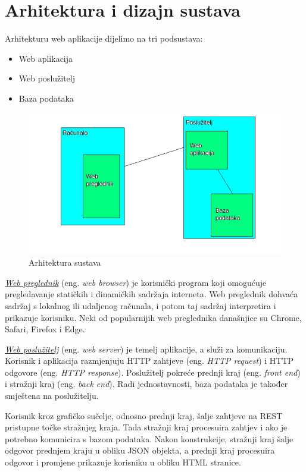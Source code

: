 \chapter{Arhitektura i dizajn sustava}
		

		Arhitekturu web aplikacije dijelimo na tri podsustava:
		\begin{itemize}
			\item Web aplikacija
			\item Web poslužitelj
			\item Baza podataka
		\end{itemize}
	
		\begin{figure}[H]
			\includegraphics[width=\textwidth]{slike/arhitektura.png}
			\centering
			\caption{Arhitektura sustava}
			\label{fig:arhitektura_sustava}
		\end{figure}
	
		\underline{\textit{Web preglednik}} (eng. \textit{web browser}) je korisnički program koji omogućuje pregledavanje statičkih i dinamičkih sadržaja interneta. Web preglednik dohvaća sadržaj s lokalnog ili udaljenog računala, i potom taj sadržaj interpretira i prikazuje korisniku. Neki od popularnijih web preglednika današnjice su Chrome, Safari, Firefox i Edge.
		
		\underline{\textit{Web poslužitelj}} (eng. \textit{web server}) je temelj aplikacije, a služi za komunikaciju. Korisnik i aplikacija razmjenjuju HTTP zahtjeve (eng. \textit{HTTP request}) i HTTP odgovore (eng. \textit{HTTP response}). Poslužitelj pokreće prednji kraj (eng. \textit{front end}) i stražnji kraj (eng. \textit{back end}). Radi jednostavnosti, baza podataka je također smještena na poslužitelju.
		
		Korisnik kroz grafičko sučelje, odnosno prednji kraj, šalje zahtjeve na REST pristupne točke stražnjeg kraja. Tada stražnji kraj procesuira zahtjev i ako je potrebno komunicira s bazom podataka. Nakon konstrukcije, stražnji kraj šalje odgovor prednjem kraju u obliku JSON objekta, a prednji kraj procesuira odgovor i promjene prikazuje korisniku u obliku HTML stranice. 
		
